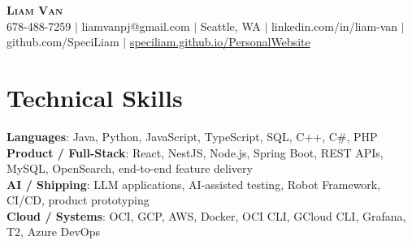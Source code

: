 \documentclass[letterpaper,11pt]{article}
\begin{document}

%
\begin{center}
    \textbf{\Huge \scshape Liam Van} \\ \vspace{1pt}
    \small 678-488-7259 $|$ \small {liamvanpj@gmail.com} $|$ Seattle, WA
 {{$|$ linkedin.com/in/liam-van} {$|$ github.com/SpeciLiam} {$|$ \href{https://speciliam.github.io/PersonalWebsite}{speciliam.github.io/PersonalWebsite}}}

\end{center}

\section{Technical Skills}
 \begin{itemize}[leftmargin=0.15in, label={}]
    \small{\item{
     \textbf{Languages}{: Java, Python, JavaScript, TypeScript, SQL, C++, C\#, PHP} \\
     \textbf{Product / Full-Stack}{: React, NestJS, Node.js, Spring Boot, REST APIs, MySQL, OpenSearch, end-to-end feature delivery} \\
     \textbf{AI / Shipping}{: LLM applications, AI-assisted testing, Robot Framework, CI/CD, product prototyping} \\
     \textbf{Cloud / Systems}{: OCI, GCP, AWS, Docker, OCI CLI, GCloud CLI, Grafana, T2, Azure DevOps} \\
    }}
 \end{itemize}
%
\end{document}

